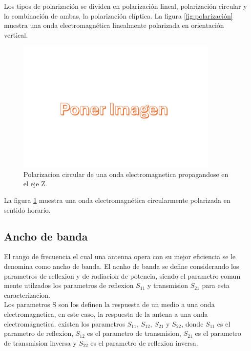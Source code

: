 Los tipos de polarización se dividen en polarización lineal, polarización circular y la combinación de ambas, la polarización elíptica. La figura \ref{fig:polarización} muestra una onda electromagnética linealmente polarizada en orientación vertical.\\

\begin{figure}
    \centering
    \includegraphics[width = 10cm]{img/imagen.png}
    \caption{Polarizacion circular de una onda electromagnetica propagandose en el eje Z.}
    \label{fig:polarizacion2}
\end{figure}

La figura \ref{fig:polarizacion2} muestra una onda electromagnética circularmente polarizada en sentido horario.\\



\subsection{Ancho de banda}

El rango de frecuencia el cual una antenna opera con su mejor eficiencia se le denomina como ancho de banda. El acnho de banda se define considerando los parametros de reflexion y de radiacion de potencia, siendo el parametro comun mente utilzados los parametros de reflexion $S_{11}$ y transmision $S_{21}$ para esta caracterizacion.\\

Los parametros S son los definen la respuesta de un medio a una onda electromagnetica, en este caso, la respuesta de la antena a una onda electromagnetica. existen los parametros $S_{11}$, $S_{12}$, $S_{21}$ y $S_{22}$, donde $S_{11}$ es el parametro de reflexion, $S_{12}$ es el parametro de transmision, $S_{21}$ es el parametro de transmision inversa y $S_{22}$ es el parametro de reflexion inversa.\\

